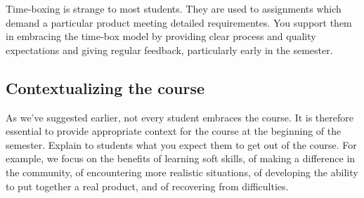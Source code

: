 Time-boxing is strange to most students.  They are used to assignments 
which demand a particular
product meeting detailed requirementes.  You support them in embracing the
time-box model by providing clear process and quality expectations and
giving regular feedback, particularly early in the semester.

\subsection{Contextualizing the course}

As we've suggested earlier, not every student embraces the course.  It
is therefore essential to provide appropriate context for the course at
the beginning of the semester.  Explain to students what you expect them
to get out of the course.  For example, we focus on the benefits of learning
soft skills, of making a difference in the community, of encountering
more realistic situations, of developing the ability to put together a
real product, and of recovering from difficulties.
